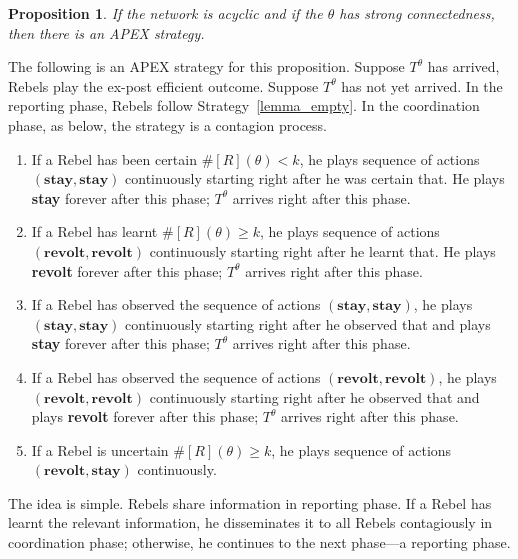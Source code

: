\documentclass[12pt,letter]{article}
\newtheorem{proposition}{Proposition}[section]
\theoremstyle{definition}
\theoremstyle{remark}
\theoremstyle{claim}
\begin{document}
\begin{proposition}
\label{lemma:small_apex}
If the network is acyclic and if the $\theta$ has strong connectedness, then there is an APEX strategy.
\end{proposition}
The following is an APEX strategy for this proposition. Suppose $T^{\theta}$ has arrived, Rebels play the ex-post efficient outcome. Suppose $T^{\theta}$ has not yet arrived. In the reporting phase, Rebels follow Strategy~\ref{lemma_empty}. In the coordination phase, as below, the strategy is a contagion process. 
\begin{enumerate}
\item If a Rebel has been certain $\#[R](\theta)<k$, he plays sequence of actions $(\textbf{stay},\textbf{stay})$ continuously starting right after he was certain that. He plays \textbf{stay} forever after this phase; $T^{\theta}$ arrives right after this phase.
\item If a Rebel has learnt $\#[R](\theta)\geq k$, he plays sequence of actions $(\textbf{revolt},\textbf{revolt})$ continuously starting right after he learnt that. He plays \textbf{revolt} forever after this phase; $T^{\theta}$ arrives right after this phase.
\item If a Rebel has observed the sequence of actions $(\textbf{stay},\textbf{stay})$, he plays $(\textbf{stay},\textbf{stay})$ continuously starting right after he observed that and plays \textbf{stay} forever after this phase; $T^{\theta}$ arrives right after this phase.
\item If a Rebel has observed the sequence of actions $(\textbf{revolt},\textbf{revolt})$, he plays $(\textbf{revolt},\textbf{revolt})$ continuously starting right after he observed that and plays \textbf{revolt} forever after this phase; $T^{\theta}$ arrives right after this phase.
\item If a Rebel is uncertain $\#[R](\theta)\geq k$, he plays sequence of actions $(\textbf{revolt},\textbf{stay})$ continuously.
\end{enumerate} 

The idea is simple. Rebels share information in reporting phase. If a Rebel has learnt the relevant information, he disseminates it to all Rebels contagiously in coordination phase; otherwise, he continues to the next phase---a reporting phase. 
\end{document}
